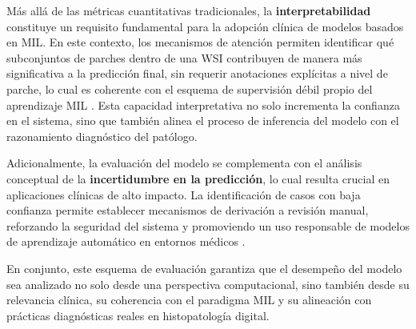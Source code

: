 Más allá de las métricas cuantitativas tradicionales, la \textbf{interpretabilidad} constituye un requisito fundamental para la adopción clínica de modelos basados en MIL. En este contexto, los mecanismos de atención permiten identificar qué subconjuntos de parches dentro de una WSI contribuyen de manera más significativa a la predicción final, sin requerir anotaciones explícitas a nivel de parche, lo cual es coherente con el esquema de supervisión débil propio del aprendizaje MIL \cite{ilse2018attention} \cite{lu2021data}. Esta capacidad interpretativa no solo incrementa la confianza en el sistema, sino que también alinea el proceso de inferencia del modelo con el razonamiento diagnóstico del patólogo.\newline

Adicionalmente, la evaluación del modelo se complementa con el análisis conceptual de la \textbf{incertidumbre en la predicción}, lo cual resulta crucial en aplicaciones clínicas de alto impacto. La identificación de casos con baja confianza permite establecer mecanismos de derivación a revisión manual, reforzando la seguridad del sistema y promoviendo un uso responsable de modelos de aprendizaje automático en entornos médicos \cite{rudin2019stop}.\newline

En conjunto, este esquema de evaluación garantiza que el desempeño del modelo sea analizado no solo desde una perspectiva computacional, sino también desde su relevancia clínica, su coherencia con el paradigma MIL y su alineación con prácticas diagnósticas reales en histopatología digital.


